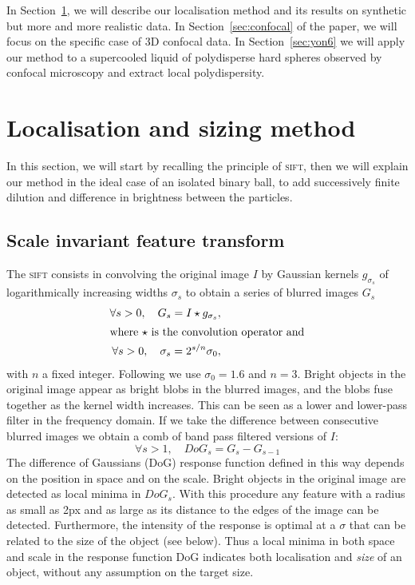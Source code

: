 \documentclass[8.5pt,twoside,twocolumn]{article}
\begin{document}
In Section~\ref{sec:method}, we will describe our localisation method and its results on synthetic but more and more realistic data. In Section~\ref{sec:confocal} of the paper, we will focus on the specific case of 3D confocal data. In Section~\ref{sec:yon6} we will apply our method to a supercooled liquid of polydisperse hard spheres observed by confocal microscopy and extract local polydispersity.

\section{Localisation and sizing method}
\label{sec:method}

In this section, we will start by recalling the principle of \textsc{sift}, then we will explain our method in the ideal case of an isolated binary ball, to add successively finite dilution and difference in brightness between the particles.

\subsection{Scale invariant feature transform}
The \textsc{sift} consists in convolving the original image $I$ by Gaussian kernels $g_{\sigma_s}$ of logarithmically increasing widths $\sigma_s$ to obtain a series of blurred images $G_s$
\begin{align}
\forall s>0,\quad G_s = I \star g_{\sigma_s}, \label{eq:gaussian_blur}\\
\intertext{where $\star$ is the convolution operator and}
\forall s>0,\quad \sigma_{s} = 2^{s/n} \sigma_0 ,
\label{eq:sigma_s}
\end{align}
with $n$ a fixed integer. Following \cite{Lowe2004} we use $\sigma_0=1.6$ and $n=3$. Bright objects in the original image appear as bright blobs in the blurred images, and the blobs fuse together as the kernel width increases. This can be seen as a lower and lower-pass filter in the frequency domain. If we take the difference between consecutive blurred images we obtain a comb of band pass filtered versions of $I$: 
\begin{equation}
\forall s>1,\quad DoG_s = G_s - G_{s-1} \label{eq:DoG_s}
\end{equation}
The difference of Gaussians (DoG) response function defined in this way depends on the position in space and on the scale. Bright objects in the original image are detected as local minima in $DoG_s$. With this procedure any feature with a radius as small as \unit{2}{px} and as large as its distance to the edges of the image can be detected. Furthermore, the intensity of the response is optimal at a $\sigma$ that can be related to the size of the object (see below). Thus a local minima in both space and scale in the response function DoG indicates both localisation and \emph{size} of an object, without any assumption on the target size.
\end{document}
